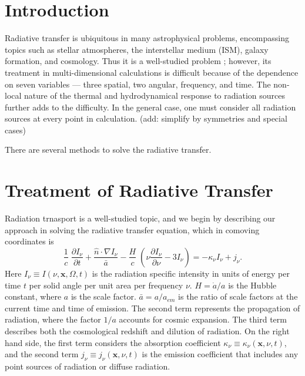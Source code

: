 \documentclass[12pt,preprint]{aastex}
\begin{document}

\section{Introduction}

Radiative transfer is ubiquitous in many astrophysical problems,
encompassing topics such as stellar atmospheres, the interstellar
medium (ISM), galaxy formation, and cosmology.  Thus it is a
well-studied problem \citep[e.g.][and more!]{Rybicki}; however, its
treatment in multi-dimensional calculations is difficult because of
the dependence on seven variables --- three spatial, two angular,
frequency, and time.  The non-local nature of the thermal and
hydrodynamical response to radiation sources further adds to the
difficulty.  In the general case, one must consider all radiation
sources at every point in calculation.  (add: simplify by symmetries
and special cases)

There are several methods to solve the radiative transfer.

\section{Treatment of Radiative Transfer}

Radiation trnasport is a well-studied topic, and we begin by
describing our approach in solving the radiative transfer equation,
which in comoving coordinates \citep{Gnedin97} is
%
\begin{equation}
  \label{eqn:rteqn}
  \frac{1}{c} \; \frac{\partial I_\nu}{\partial t} + 
  \frac{\hat{n} \cdot \nabla I_\nu}{\bar{a}} -
  \frac{H}{c} \; \left( \nu \frac{\partial I_\nu}{\partial \nu} -
  3 I_\nu \right) = -\kappa_\nu I_\nu + j_\nu .
\end{equation}
%
Here $I_\nu \equiv I(\nu, \mathbf{x}, \Omega, t)$ is the radiation
specific intensity in units of energy per time $t$ per solid angle per
unit area per frequency $\nu$.  $H = \dot{a}/a$ is the Hubble
constant, where $a$ is the scale factor.  $\bar{a} = a/a_{em}$ is the
ratio of scale factors at the current time and time of emission.  The
second term represents the propagation of radiation, where the factor
$1/a$ accounts for cosmic expansion.  The third term describes both
the cosmological redshift and dilution of radiation.  On the right
hand side, the first term considers the absorption coefficient
$\kappa_\nu \equiv \kappa_\nu(\mathbf{x},\nu,t)$, and the second term
$j_\nu \equiv j_\nu(\mathbf{x},\nu,t)$ is the emission coefficient
that includes any point sources of radiation or diffuse radiation.
\end{document}
